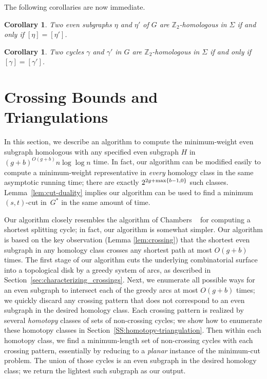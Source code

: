 \documentclass[11pt,twoside]{article}
\def\Z{\mathbb{Z}}
\let\cycle\gamma
\newtheorem{corollary}[theorem]{Corollary}
\begin{document}
The following corollaries are now immediate.

\begin{corollary}
Two even subgraphs $\eta$ and $\eta'$ of $G$ are $\Z_2$-homologous in $\Sigma$ if and only if $[\eta] = [\eta']$.
\end{corollary}

\begin{corollary}
Two cycles $\cycle$ and $\cycle'$ in $G$ are $\Z_2$-homologous in $\Sigma$ if and only if $[\cycle] = [\cycle']$.
\end{corollary}

\section{Crossing Bounds and Triangulations}
\label{sec:crossing}


In this section, we describe an
algorithm to compute the minimum-weight even subgraph homologous with any specified even subgraph 
$H$ in $(g+b)^{O(g+b)}n\log \log n$ time.  In fact, our algorithm can be
modified easily to compute a minimum-weight representative in
\emph{every} homology class in the same asymptotic running time;
there are exactly $2^{2g+\max\{ b-1,0 \}}$ such classes.
Lemma~\ref{lem:cut-duality} implies our algorithm can be used to find a minimum $(s,t)$-cut in~$G^*$ in the same amount of time.

Our algorithm closely resembles the algorithm of Chambers \etal~\cite{ccelw-scsih-08} for computing a shortest splitting cycle; in fact, our algorithm is somewhat simpler.  Our algorithm is based on the key observation (Lemma \ref{lem:crossing})  that the shortest even subgraph in any homology class crosses any shortest path at most $O(g+b)$ times.  The first stage of our algorithm cuts the underlying combinatorial surface into a topological disk by a greedy system of arcs, as described in Section~\ref{sec:characterizing_crossings}.  Next, we enumerate all possible ways for an even subgraph to intersect each of the greedy arcs at most $O(g+b)$ times; we quickly discard any crossing pattern that does not correspond to an even subgraph in the desired homology class.  Each crossing pattern is realized by several \emph{homotopy} classes of sets of non-crossing cycles; we show how to enumerate these homotopy classes in Section~\ref{SS:homotopy-triangulation}.  Then within each homotopy class, we find a minimum-length set of non-crossing cycles with each crossing pattern, essentially by reducing to a \emph{planar} instance of the minimum-cut problem.  The union of those cycles is an even subgraph in the desired homology class; we return the lightest such subgraph as our output.
\end{document}
